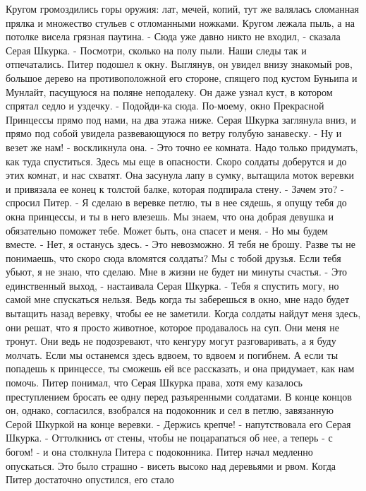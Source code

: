 Кругом громоздились горы оружия: лат, мечей, копий, тут же валялась 
сломанная прялка и множество стульев с отломанными ножками. Кругом 
лежала пыль, а на потолке висела грязная паутина.
    - Сюда уже давно никто не входил, - сказала Серая Шкурка. - 
Посмотри, сколько на полу пыли. Наши следы так и отпечатались.
    Питер подошел к окну. Выглянув, он увидел внизу знакомый ров, 
большое дерево на противоположной его стороне, спящего под кустом 
Буньипа и Мунлайт, пасущуюся на поляне неподалеку. Он даже узнал куст, 
в котором спрятал седло и уздечку.
    - Подойди-ка сюда. По-моему, окно Прекрасной Принцессы прямо под 
нами, на два этажа ниже.
    Серая Шкурка заглянула вниз, и прямо под собой увидела 
развевающуюся по ветру голубую занавеску.
    - Ну и везет же нам! - воскликнула она. - Это точно ее комната. 
Надо только придумать, как туда спуститься. Здесь мы еще в опасности. 
Скоро солдаты доберутся и до этих комнат, и нас схватят.
    Она засунула лапу в сумку, вытащила моток веревки и привязала ее 
конец к толстой балке, которая подпирала стену.
    - Зачем это? - спросил Питер.
    - Я сделаю в веревке петлю, ты в нее сядешь, я опущу тебя до окна 
принцессы, и ты в него влезешь. Мы знаем, что она добрая девушка и 
обязательно поможет тебе. Может быть, она спасет и меня.
    - Но мы будем вместе.
    - Нет, я останусь здесь.
    - Это невозможно. Я тебя не брошу. Разве ты не понимаешь, что 
скоро сюда вломятся солдаты? Мы с тобой друзья. Если тебя убьют, я не 
знаю, что сделаю. Мне в жизни не будет ни минуты счастья.
    - Это единственный выход, - настаивала Серая Шкурка. - Тебя я 
спустить могу, но самой мне спускаться нельзя. Ведь когда ты 
заберешься в окно, мне надо будет вытащить назад веревку, чтобы ее не 
заметили. Когда солдаты найдут меня здесь, они решат, что я просто 
животное, которое продавалось на суп. Они меня не тронут. Они ведь не 
подозревают, что кенгуру могут разговаривать, а я буду молчать. Если 
мы останемся здесь вдвоем, то вдвоем и погибнем. А если ты попадешь к 
принцессе, ты сможешь ей все рассказать, и она придумает, как нам 
помочь.
    Питер понимал, что Серая Шкурка права, хотя ему казалось 
преступлением бросать ее одну перед разъяренными солдатами. В конце 
концов он, однако, согласился, взобрался на подоконник и сел в петлю, 
завязанную Серой Шкуркой на конце веревки.
    - Держись крепче! - напутствовала его Серая Шкурка. - Оттолкнись 
от стены, чтобы не поцарапаться об нее, а теперь - с богом! - и она 
столкнула Питера с подоконника.
    Питер начал медленно опускаться. Это было страшно - висеть высоко 
над деревьями и рвом. Когда Питер достаточно опустился, его стало 
